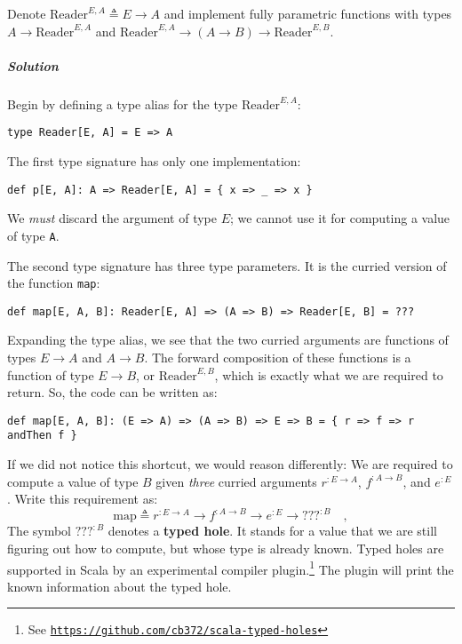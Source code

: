 Denote $\text{Reader}^{E,A}\triangleq E\rightarrow A$ and implement
fully parametric functions with types $A\rightarrow\text{Reader}^{E,A}$
and $\text{Reader}^{E,A}\rightarrow(A\rightarrow B)\rightarrow\text{Reader}^{E,B}$.

\subparagraph{Solution}

Begin by defining a type alias for the type $\text{Reader}^{E,A}$:
\begin{lstlisting}
type Reader[E, A] = E => A
\end{lstlisting}
The first type signature has only one implementation:
\begin{lstlisting}
def p[E, A]: A => Reader[E, A] = { x => _ => x }
\end{lstlisting}
We \emph{must} discard the argument of type $E$; we cannot use it
for computing a value of type \lstinline!A!.

The second type signature has three type parameters. It is the curried
version of the function \lstinline!map!:
\begin{lstlisting}
def map[E, A, B]: Reader[E, A] => (A => B) => Reader[E, B] = ???
\end{lstlisting}
Expanding the type alias, we see that the two curried arguments are
functions of types $E\rightarrow A$ and $A\rightarrow B$. The forward
composition of these functions is a function of type $E\rightarrow B$,
or $\text{Reader}^{E,B}$, which is exactly what we are required to
return. So, the code can be written as:

\begin{lstlisting}
def map[E, A, B]: (E => A) => (A => B) => E => B = { r => f => r andThen f }
\end{lstlisting}
If we did not notice this shortcut, we would reason differently: We
are required to compute a value of type $B$ given \emph{three} curried
arguments $r^{:E\rightarrow A}$, $f^{:A\rightarrow B}$, and $e^{:E}$.
Write this requirement as:
\[
\text{map}\triangleq r^{:E\rightarrow A}\rightarrow f^{:A\rightarrow B}\rightarrow e^{:E}\rightarrow???^{:B}\quad,
\]
The symbol $\text{???}^{:B}$ denotes a \textbf{typed
hole}. It stands for a value that we are still figuring out how to
compute, but whose type is already known. Typed holes are supported
in Scala by an experimental compiler plugin.\footnote{See \texttt{\href{https://github.com/cb372/scala-typed-holes}{https://github.com/cb372/scala-typed-holes}}}
The plugin will print the known information about the typed hole.

